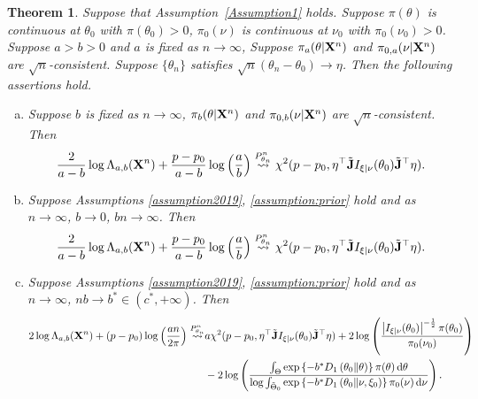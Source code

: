 \documentclass[11pt]{article}
\theoremstyle{plain}
\newtheorem{theorem}{\quad\quad Theorem}
\theoremstyle{definition}
\theoremstyle{remark}
\begin{document}
\begin{theorem}\label{Thm:maintheorem}
    Suppose that Assumption~\ref{Assumption1} holds.
Suppose $\pi(\theta)$ is continuous at $\theta_0$ with $\pi(\theta_0)>0$, $\pi_0(\nu)$ is continuous at $\nu_0$ with $\pi_0 (\nu_0)> 0$.
    Suppose $a>b>0$ and $a$ is fixed as $n\to \infty$,
    Suppose $\pi_a( \theta | \mathbf{X}^n)$ and $\pi_{0, a}(\nu | \mathbf{X}^n)$ are $\sqrt n$-consistent.
    Suppose $\{\theta_n\}$ satisfies $\sqrt{n}(\theta_n-\theta_0)\to \eta$.
Then the following assertions hold.
\begin{enumerate}[(a)]
        \item 
            Suppose $b$ is fixed  as $n\to \infty$,
            $\pi_b(\theta|\mathbf{X}^{n})$ and $\pi_{0,b}(\nu | \mathbf{X}^{n})$ are $\sqrt{n}$-consistent.
            Then
    $$
        \frac{2}{a-b}
        \log \Lambda_{a,b} (\mathbf{X}^n)
        +\frac{p-p_0}{a-b}
        \log \left(\frac{a}{b}\right)
    \overset{P^n_{\theta_n}}{\rightsquigarrow} 
    \chi^2(p-p_0,\eta^\top\tilde {\mathbf{J}} I_{\xi|\nu}(\theta_0) \tilde{\mathbf{J}}^\top\eta)
.
    $$
\item
Suppose Assumptions
\ref{assumption2019}, \ref{assumption:prior} hold 
and
as $n \to \infty$, $b\to 0$, $bn \to \infty$.
Then
\begin{align*}
        \frac{2}{a-b}
    \log \Lambda_{a,b} (\mathbf{X}^n)
+
\frac{p-p_0}{a-b}
\log \left(\frac{a}{b}\right)
\overset{P^n_{\theta_n}}{\rightsquigarrow}
    \chi^2(p-p_0, \eta^\top\tilde {\mathbf{J}} I_{\xi|\nu}(\theta_0) \tilde{\mathbf{J}}^\top\eta)
    .
\end{align*}

\item
Suppose Assumptions
\ref{assumption2019}, \ref{assumption:prior} hold
and    
as $n \to \infty$, $nb\to b^* \in (c^*, +\infty)$.
    Then
\begin{align*}
    2\log \Lambda_{a,b} (\mathbf{X}^n)
+{(p-p_0)} \log \left( \frac{an}{2\pi} \right)
\overset{P^n_{\theta_n}}{\rightsquigarrow}
&
 a \chi^2 (p-p_0, \eta^\top\tilde {\mathbf{J}} I_{\xi|\nu}(\theta_0) \tilde{\mathbf{J}}^\top\eta )
 +
2\log\left( \frac{
        \left|I_{\xi| \nu} (\theta_0)\right|^{-\frac 1 2}
\pi(\theta_0)}{\pi_0(\nu_0)} \right)
\\
&
-2\log 
\left( 
\frac{
    \int_{\Theta} \exp\left\{ -b^* D_1\left( \theta_0 \| \theta \right)\right\} \pi(\theta) \, \mathrm d \theta 
}{
\log \int_{\tilde \Theta_0} \exp\left\{ -b^* D_1\left( \theta_0 \| \nu, \xi_0 \right)\right\} \pi_0(\nu) \, \mathrm d \nu
}
\right)
.
\end{align*}
    \end{enumerate}
\end{theorem}
\end{document}
